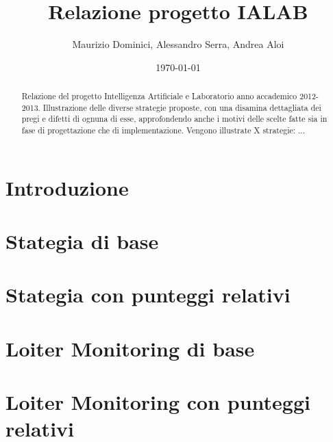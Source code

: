 \documentclass[a4paper,12pt, twoside]{report}
\title{Relazione progetto IALAB}
\author{Maurizio Dominici, Alessandro Serra, Andrea Aloi}
\date{\today}
\begin{document}
\maketitle
 
\begin{abstract}
Relazione del progetto Intelligenza Artificiale e Laboratorio anno accademico 2012-2013.
Illustrazione delle diverse strategie proposte, con una disamina dettagliata dei pregi e difetti di ognuna di esse, approfondendo anche i motivi delle scelte fatte sia in fase di progettazione che di implementazione. Vengono illustrate X strategie: ...
\end{abstract}

\newpage
 
\tableofcontents
\clearpage{\pagestyle{empty}\cleardoublepage}

\chapter{Introduzione} \label{cap:intro}


\chapter{Stategia di base} \label{cap:base}


\chapter{Stategia con punteggi relativi} \label{cap:rel}


\chapter{Loiter Monitoring di base} \label{cap:loiter-base}


\chapter{Loiter Monitoring con punteggi relativi} \label{cap:loiter-rel}

%
\end{document}
